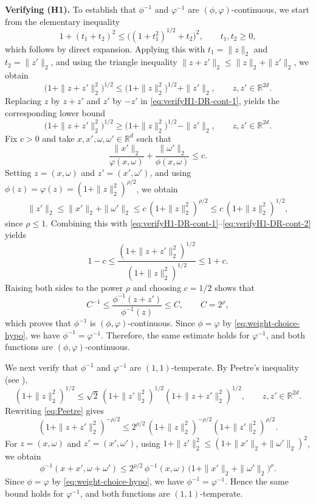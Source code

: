 \documentclass[a4paper,12pt]{article}
\newcommand{\R}{\mathbb{R}}
\begin{document}
\color{black}
\textbf{Verifying (H1).}
To establish that $\phi^{-1}$ and $\varphi^{-1}$ are $(\phi,\varphi)$-continuous,
we start from the elementary inequality
\[
1+(t_1+t_2)^2 \le \bigl((1+t_1^2)^{1/2}+t_2\bigr)^2,
\qquad t_1,t_2\ge 0,
\]
which follows by direct expansion. Applying this with
$t_1=\|z\|_2$ and $t_2=\|z'\|_2$, and using the triangle inequality
$\|z+z'\|_2 \le \|z\|_2+\|z'\|_2$, we obtain
\begin{equation}\label{eq:verifyH1-DR-cont-1}
\bigl(1+\|z+z'\|_2^2\bigr)^{1/2}
\le
\bigl(1+\|z\|_2^2\bigr)^{1/2}+\|z'\|_2,
\qquad z,z'\in\R^{2d}.
\end{equation}
Replacing \(z\) by \(z+z'\) and \(z'\) by \(-z'\) in
\eqref{eq:verifyH1-DR-cont-1}, yields the
corresponding lower bound
\begin{equation}\label{eq:verifyH1-DR-cont-2}
\bigl(1+\|z+z'\|_2^2\bigr)^{1/2}
\ge
\bigl(1+\|z\|_2^2\bigr)^{1/2}-\|z'\|_2,
\qquad z,z'\in\R^{2d}.
\end{equation}
Fix $c>0$ and take $x,x',\omega,\omega'\in\R^d$ such that
\[
\frac{\|x'\|_2}{\varphi(x,\omega)}+\frac{\|\omega'\|_2}{\phi(x,\omega)}\le c.
\]
Setting $z=(x,\omega)$ and $z'=(x',\omega')$, and using $\phi(z)=\varphi(z)=(1+\|z\|_2^2)^{\rho/2}$, we obtain
\[
\|z'\|_2
\le \|x'\|_2+\|\omega'\|_2
\le c\,(1+\|z\|_2^2)^{\rho/2}
\le c\,(1+\|z\|_2^2)^{1/2},
\]
since $\rho\le 1$. Combining this with
\eqref{eq:verifyH1-DR-cont-1}–\eqref{eq:verifyH1-DR-cont-2} yields
\[
1-c
\le
\frac{(1+\|z+z'\|_2^2)^{1/2}}{(1+\|z\|_2^2)^{1/2}}
\le
1+c.
\]
Raising both sides to the power $\rho$ and choosing $c=1/2$ shows that
\[
C^{-1}
\le
\frac{\phi^{-1}(z+z')}{\phi^{-1}(z)}
\le
C,
\qquad C=2^\rho,
\]
which proves that $\phi^{-1}$ is $(\phi,\varphi)$-continuous. Since $\phi=\varphi$ by \eqref{eq:weight-choice-hypo}, we have $\phi^{-1}=\varphi^{-1}$.
Therefore, the same estimate holds for $\varphi^{-1}$, and both functions are
$(\phi,\varphi)$-continuous.

We next verify that $\phi^{-1}$ and $\varphi^{-1}$ are $(1,1)$-temperate.
By Peetre’s inequality (see \cite[(2.21)]{treves_introduction_1980}),
\begin{equation}\label{eq:Peetre}
(1+\|z\|_2^2)^{1/2}
\le
\sqrt{2}\,(1+\|z'\|_2^2)^{1/2}(1+\|z+z'\|_2^2)^{1/2},
\qquad z,z'\in\R^{2d}.
\end{equation}
Rewriting \eqref{eq:Peetre} gives
\begin{equation}\label{eq:DR-HA-hypo-tempstep}
(1+\|z+z'\|_2^2)^{-\rho/2}
\le
2^{\rho/2}\,
(1+\|z\|_2^2)^{-\rho/2}
(1+\|z'\|_2^2)^{\rho/2}.
\end{equation}
For $z=(x,\omega)$ and $z'=(x',\omega')$, using
$1+\|z'\|_2^2\le (1+\|x'\|_2+\|\omega'\|_2)^2$, we obtain
\[
\phi^{-1}(x+x',\omega+\omega')
\le
2^{\rho/2}\,\phi^{-1}(x,\omega)\,
\bigl(1+\|x'\|_2+\|\omega'\|_2\bigr)^\rho.
\]
Since $\phi=\varphi$ by \eqref{eq:weight-choice-hypo}, we have $\phi^{-1}=\varphi^{-1}$.
Hence the same bound holds for $\varphi^{-1}$, and both functions are
$(1,1)$-temperate.
\end{document}

